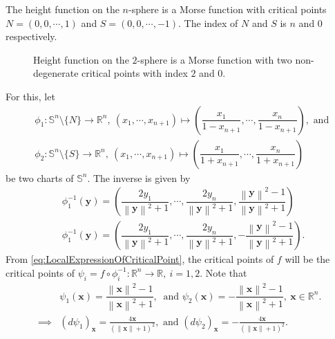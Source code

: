 \begin{eg}\label{eg:HeightFunctionOnSphere}
    The height function on the $n$-sphere is a Morse function with critical points $N=(0,0,\cdots, 1)$ and $S=(0,0,\cdots,-1)$. The index of $N$ and $S$ is $n$ and $0$ respectively. 
    \begin{figure}[H]
        \centering
        \caption{Height function on the $2$-sphere is a Morse function with two non-degenerate critical points with index $2$ and $0$.}
        \label{fig:HeightFunctionOnSphere}
    \end{figure}
    
    For this, let
    \begin{align*}
        & \phi_1:\mathbb{S}^n
        \setminus\{N\}\to \mathbb{R}^n,~ \left(x_1,\cdots,x_{n+1}\right)\mapsto \left(\dfrac{x_1 }{1-x_{n+1}},\cdots,\dfrac{x_n}{1-x_{n+1}}\right),\text{ and } \\[1ex]
        & \phi_2:\mathbb{S}^n\setminus\{S\}\to \mathbb{R}^n,~ \left(x_1,\cdots,x_{n+1}\right)\mapsto \left(\dfrac{x_1 }{1+x_{n+1}},\cdots,\dfrac{x_n}{1+x_{n+1}}\right)
    \end{align*} 
    be two charts of $\mathbb{S}^n$. The inverse is given by 
    \begin{align*}
        & \phi_1^{-1}(\mathbf{y}) = \left(\dfrac{2y_1}{\left\|\mathbf{y}\right\|^2+1}, \cdots, \dfrac{2y_n}{\left\|\mathbf{y}\right\|^2+1},\dfrac{\left\|\mathbf{y}\right\|^2-1}{\left\|\mathbf{y}\right\|^2+1}\right) \\[1ex]
        & \phi_1^{-1}(\mathbf{y}) = \left(\dfrac{2y_1}{\left\|\mathbf{y}\right\|^2+1}, \cdots, \dfrac{2y_n}{\left\|\mathbf{y}\right\|^2+1},-\dfrac{\left\|\mathbf{y}\right\|^2-1}{\left\|\mathbf{y}\right\|^2+1}\right).
    \end{align*} 
    From \cref{eq:LocalExpressionOfCriticalPoint}, the critical points of $f$ will be the critical points of $\psi_i=f\circ \phi_i^{-1}:\mathbb{R}^n\to \mathbb{R},~i=1,2$. Note that 
    \begin{align*}
        & \psi_1(\mathbf{x}) = \dfrac{\left\|\mathbf{x}\right\|^2-1}{\left\|\mathbf{x}\right\|^2+1},~\text{ and } \psi_2(\mathbf{x}) = -\dfrac{\left\|\mathbf{x}\right\|^2-1}{\left\|\mathbf{x}\right\|^2+1},~\mathbf{x}\in \mathbb{R}^n. \\[1ex]
        \implies & \left(d\psi_1\right)_\mathbf{x} = \frac{4 \mathbf{x}}{\left(\left\|\mathbf{x}\right\|+1\right)^2},\text{ and } \left(d\psi_2\right)_\mathbf{x} = -\frac{4 \mathbf{x}}{\left(\left\|\mathbf{x}\right\|+1\right)^2}.

\end{align*}
\end{eg}
